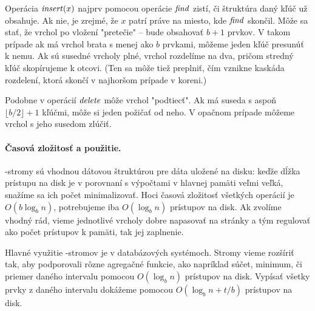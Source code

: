 Operácia $\mathop{\mathit{insert}}(x)$ najprv pomocou operácie $\mathop{\mathit{find}}$ zistí, či štruktúra daný kľúč už obsahuje.
Ak nie, je zrejmé, že $x$ patrí práve na miesto, kde $\mathop{\mathit{find}}$ skončil.
Môže sa stať, že vrchol po vložení "pretečie" -- bude obsahovať $b+1$ prvkov. V takom prípade
ak má vrchol brata s menej ako $b$ prvkami, môžeme jeden kľúč presunúť k nemu.
Ak sú susedné vrcholy plné, vrchol rozdelíme na dva, pričom stredný kľúč skopírujeme
k otcovi. (Ten sa môže tiež preplniť, čím vznikne kaskáda rozdelení, ktorá skončí
v najhoršom prípade v koreni.)

Podobne v operácií $\mathop{\mathit{delete}}$ môže vrchol "podtiecť". Ak má suseda s aspoň $\lfloor b/2 \rfloor+1$
kľúčmi, môže si jeden požičať od neho. V opačnom prípade môžeme vrchol s jeho susedom zlúčiť.

\paragraph{Časová zložitosť a použitie.}
\Bp-stromy sú vhodnou dátovou štruktúrou pre dáta uložené na disku: keďže dĺžka prístupu na
disk je v porovnaní s výpočtami v hlavnej pamäti veľmi veľká, snažíme sa ich počet minimalizovať.
Hoci časová zložitosť všetkých operácií je $O(b\log_b n)$, potrebujeme iba $O(\log_b n)$ prístupov
na disk. Ak zvolíme vhodný rád, vieme jednotlivé vrcholy dobre napasovať na stránky a tým regulovať
ako počet prístupov k pamäti, tak jej zaplnenie.

Hlavné využitie \Bp-stromov je v databázových systémoch. Stromy vieme rozšíriť tak, aby podporovali
rôzne agregačné funkcie, ako napríklad súčet, minimum, či priemer daného intervalu pomocou $O(\log_b n)$
prístupov na disk. Vypísať všetky prvky z daného intervalu dokážeme pomocou $O(\log_b n + t/b)$ prístupov na disk.

